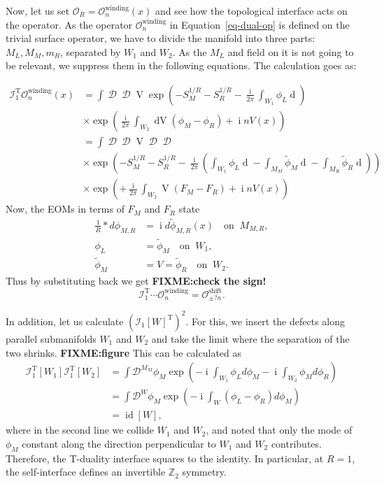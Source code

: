 \documentclass[
  letterpaper,
  DIV=11,
  numbers=noendperiod]{scrreport}
\DeclareMathOperator{\imunit}{i}
\DeclareMathOperator{\id}{id}
\begin{document}
Now, let us set \(\mathcal{O}_R = \mathcal{O}^\text{winding}_n(x)\) and
see how the topological interface acts on the operator. As the operator
\(\mathcal{O}^\text{winding}_n\) in Equation~\ref{eq-dual-op} is defined
on the trivial surface operator, we have to divide the manifold into
three parts: \(M_L,M_M,m_R\), separated by \(W_1\) and \(W_2\). As the
\(M_L\) and field on it is not going to be relevant, we suppress them in
the following equations. The calculation goes as:

\[
\begin{aligned}
\mathcal{I}_1^\text{T} \mathcal{O}^\text{winding}_n(x)
&= \int \mathop{\mathcal{D}\phi_M}\mathop{\mathcal{D}\phi_R}\mathop{\mathcal{D}^{W_2}V}
\exp\left(-S_M^{1/R}-S_R^{1/R}-\frac{\imunit}{2\pi}\int_{W_1}\phi_L \mathop{d\phi_M}\right)\\
 &\times\exp\left(\frac{\imunit}{2\pi}\int_{W_2}\mathop{dV}(\phi_M-\phi_R) + \imunit n V(x) \right)\\
&= \int \mathop{\mathcal{D}F_M}\mathop{\mathcal{D}F_R}\mathop{\mathcal{D}^{W_2}V}\mathop{\mathcal{D}\widetilde\phi_M}\mathop{\mathcal{D}\widetilde\phi_R}\\
&\times\exp\left(-S_M^{1/R}-S_R^{1/R}-\frac{\imunit}{2\pi}(\int_{W_1}\phi_L \mathop{d\phi_M}-\int_{M_M}\tilde{\phi}_M\mathop{dF_M} - \int_{M_R}\tilde{\phi}_R\mathop{dF_R})\right)\\
 &\times\exp\left(+\frac{\imunit}{2\pi}\int_{W_2}\mathop{V}(F_M-F_R) + \imunit n V(x) \right)
\end{aligned}
\] Now, the EOMs in terms of \(F_M\) and \(F_R\) state \[
\begin{aligned}
    \frac{1}{R} *d\phi_{M,R} &= \imunit d\widetilde\phi_{M,R}(x) \quad \text{on} \;\; M_{M,R}, \\
    \phi_L &= \widetilde{\phi}_M \quad \text{on} \;\; W_1,\\
\tilde{\phi}_M &= V = \tilde{\phi}_R \quad \text{on} \;\; W_2.
\end{aligned}
\] Thus by substituting back we get \textbf{FIXME:check the sign!} \[
\mathcal{I}_1^\text{T}\cdots\mathcal{O}_n^\text{winding} = \mathcal{O}_{\pm? n}^\text{shift}.
\]

In addition, let us calculate \((\mathcal{I}_1[W]^\text{T})^2\). For
this, we insert the defects along parallel submanifolds \(W_1\) and
\(W_2\) and take the limit where the separation of the two shrinks.
\textbf{FIXME:figure} This can be calculated as \[
\begin{aligned}
\mathcal{I}_1^\text{T}[W_1]\mathcal{I}_1^\text{T}[W_2]
&= \int \mathcal{D}^{M_M}\phi_M \exp(-\imunit \int_{W_1} \phi_L d\phi_M - \imunit\int_{W_2} \phi_M d\phi_R)\\
&= \int \mathcal{D}^{W}\phi_M \exp(-\imunit \int_{W} (\phi_L - \phi_R) d\phi_M)\\
&= \id[W],
\end{aligned}
\] where in the second line we collide \(W_1\) and \(W_2\), and noted
that only the mode of \(\phi_M\) constant along the direction
perpendicular to \(W_1\) and \(W_2\) contributes. Therefore, the
T-duality interface squares to the identity. In particular, at \(R=1\),
the self-interface defines an invertible \(\mathbb{Z}_2\) symmetry.
\end{document}
